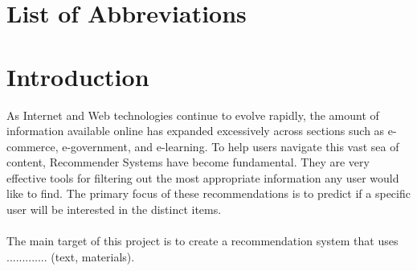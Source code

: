 \documentclass[10pt,oneside,english,a4paper]{article}
\begin{document}

\newpage{} 

\setcounter{page}{6}
\tableofcontents
\newpage{}
\listoffigures
\listoftables
\section*{List of Abbreviations}


\clearpage{} 
\setcounter{page}{1}

\section{Introduction}
As Internet and Web technologies continue to evolve rapidly, the amount of information available online has expanded excessively across sections such as e-commerce, e-government, and e-learning. To help users navigate this vast sea of content, Recommender Systems have become fundamental. They are very effective tools for filtering out the most appropriate information any user would like to find. The primary focus of these recommendations is to predict if a specific user will be interested in the distinct items.\\\\
The main target of this project is to create a recommendation system that uses ............. (text, materials).






\clearpage{}
\end{document}
